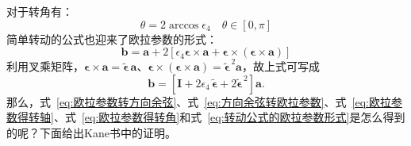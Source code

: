 对于转角有：
\begin{equation}
    \theta=2\arccos\epsilon_4 \quad \theta \in [0,\pi]
    \label{eq:欧拉参数得转角}
\end{equation}
简单转动的公式也迎来了欧拉参数的形式：
\begin{equation}
    \mathbf{b}=\mathbf{a}+2[\epsilon_4 \bm{\epsilon}\times\mathbf{a}+\bm{\epsilon}\times(\bm{\epsilon}\times\mathbf{a})]
    \label{eq:转动公式的欧拉参数形式}
\end{equation}
利用叉乘矩阵，$\bm{\epsilon}\times\mathbf{a}=\tilde{\bm{\epsilon}}\,\mathbf{a}$、$\bm{\epsilon}\times(\bm{\epsilon}\times\mathbf{a})=\tilde{\bm{\epsilon}}^{\,2}\mathbf{a}$，故上式可写成
\begin{equation}
    \mathbf{b}=\left[\bm{I}+2\epsilon_4\,\tilde{\bm{\epsilon}}+2\tilde{\bm{\epsilon}}^{\,2}\right]\mathbf{a}.
    \label{eq:转动公式的欧拉参数形式矩阵}
\end{equation}
那么，式~\eqref{eq:欧拉参数转方向余弦}、式~\eqref{eq:方向余弦转欧拉参数}、式~\eqref{eq:欧拉参数得转轴}、式~\eqref{eq:欧拉参数得转角}和式~\eqref{eq:转动公式的欧拉参数形式}是怎么得到的呢？下面给出Kane书中的证明。

